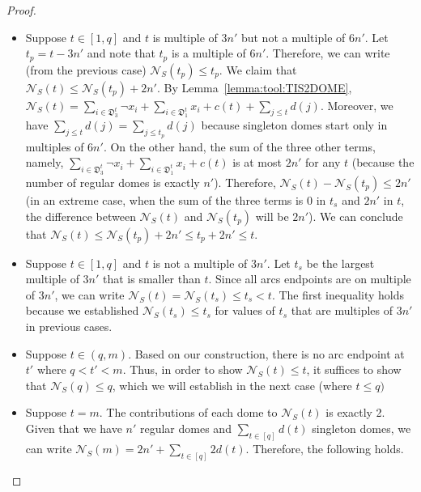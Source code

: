\documentclass[letterpaper,11pt]{article}
\begin{document}
\begin{proof}
\begin{itemize}
\item Suppose $t\in[1,q]$ and $t$ is multiple of $3n'$ but not a multiple of $6n'$. 
Let $t_p = t-3n'$ and note that $t_p$ is a multiple of $6n'$. Therefore, we can write (from the previous case) $\mathcal{N}_{S}(t_p) \leq t_p$.
We claim that $\mathcal{N}_{S}(t) \leq \mathcal{N}_{S}(t_p) + 2n'$. 
By Lemma~\ref{lemma:tool:TIS2DOME}, $\mathcal{N}_{S}(t)=\sum_{i \in \mathfrak{D}_3^t} \neg{x_i} +  \sum_{i \in \mathfrak{D}_1^t} x_i  + c(t) + \sum_{j \leq t} d(j)$. Moreover, we have $\sum_{j\leq t} d(j) = \sum_{j\leq t_p} d(j)$ because singleton domes start only in multiples of $6n'$. On the other hand, the sum of the three other terms, namely, $\sum_{i \in \mathfrak{D}_3^t} \neg{x_i} +  \sum_{i \in \mathfrak{D}_1^t} x_i  + c(t)$ is at most $2n'$ for any $t$ (because the number of regular domes is exactly $n'$). Therefore, $\mathcal{N}_S(t)-\mathcal{N}_{S}(t_p) \leq 2n'$ (in an extreme case, when the sum of the three terms is $0$ in $t_s$ and $2n'$ in $t$, the difference between $\mathcal{N}_S(t)$ and $\mathcal{N}_S(t_p)$ will be $2n'$).
We can conclude that $\mathcal{N}_S(t) \leq \mathcal{N}_S(t_p) + 2n' \leq t_p + 2n' \leq t$.


\item Suppose $t\in [1,q]$ and $t$ is not a multiple of $3n'$. Let $t_s$ be the largest multiple of $3n'$ that is smaller than $t$. Since all arcs endpoints are on multiple of $3n'$, we can write $\mathcal{N}_S(t) = \mathcal{N}_S(t_s) \leq t_s < t$. The first inequality holds because we established $\mathcal{N}_S(t_s) \leq t_s$ for values of $t_s$ that are multiples of $3n'$ in previous cases. 

    \item Suppose 
$t \in (q, m)$. Based on our construction, there is no arc endpoint at $t'$ where $q < t' < m$. Thus, in order to show $\mathcal{N}_{S}(t) \leq t$, it suffices to show that $\mathcal{N}_{S}(q)\leq q$, which we will establish in the next case (where $t \leq q)$ 
\item 
Suppose $t=m$. The contributions of each dome to $\mathcal{N}_S(t)$ is exactly 2. Given that we have $n'$ regular domes and $\sum_{t\in[q]}d(t)$ singleton domes, we can write $\mathcal{N}_S(m)=2n'+\sum_{t\in [q]}2d(t)$. Therefore, the following holds.



\end{itemize}
\end{proof}
\end{document}
